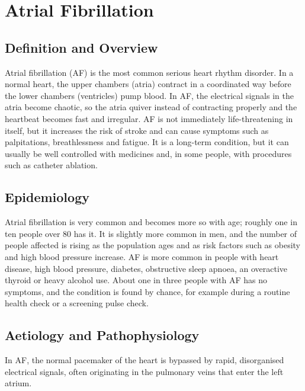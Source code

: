 \chapter{Atrial Fibrillation}

\section*{Definition and Overview}
Atrial fibrillation (AF) is the most common serious heart rhythm disorder. In a normal heart, the upper chambers (atria) contract in a coordinated way before the lower chambers (ventricles) pump blood. In AF, the electrical signals in the atria become chaotic, so the atria quiver instead of contracting properly and the heartbeat becomes fast and irregular. AF is not immediately life-threatening in itself, but it increases the risk of stroke and can cause symptoms such as palpitations, breathlessness and fatigue. It is a long-term condition, but it can usually be well controlled with medicines and, in some people, with procedures such as catheter ablation.

\section*{Epidemiology}
Atrial fibrillation is very common and becomes more so with age; roughly one in ten people over 80 has it. It is slightly more common in men, and the number of people affected is rising as the population ages and as risk factors such as obesity and high blood pressure increase. AF is more common in people with heart disease, high blood pressure, diabetes, obstructive sleep apnoea, an overactive thyroid or heavy alcohol use. About one in three people with AF has no symptoms, and the condition is found by chance, for example during a routine health check or a screening pulse check.

\section*{Aetiology and Pathophysiology}
In AF, the normal pacemaker of the heart is bypassed by rapid, disorganised electrical signals, often originating in the pulmonary veins that enter the left atrium.

